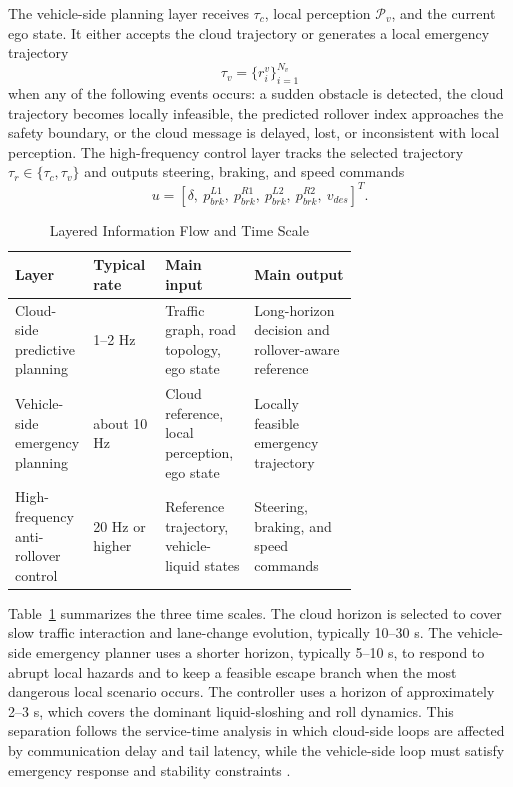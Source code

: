 The vehicle-side planning layer receives $\tau_c$, local perception $\mathcal{P}_v$, and the current ego state. It either accepts the cloud trajectory or generates a local emergency trajectory
\begin{equation}
  \tau_v=\{r_i^v\}_{i=1}^{N_v}
\end{equation}
when any of the following events occurs: a sudden obstacle is detected, the cloud trajectory becomes locally infeasible, the predicted rollover index approaches the safety boundary, or the cloud message is delayed, lost, or inconsistent with local perception. The high-frequency control layer tracks the selected trajectory $\tau_r\in\{\tau_c,\tau_v\}$ and outputs steering, braking, and speed commands
\begin{equation}
  u=[\delta,\ p_{brk}^{L1},\ p_{brk}^{R1},\ p_{brk}^{L2},\ p_{brk}^{R2},\ v_{des}]^T.
\end{equation}

\begin{table}[t]
  \centering
  \caption{Layered Information Flow and Time Scale}
  \label{tab:workflow_timescale}
  \begin{tabularx}{\linewidth}{p{0.21\linewidth}p{0.21\linewidth}p{0.26\linewidth}X}
    \toprule
    Layer & Typical rate & Main input & Main output \\
    \midrule
    Cloud-side predictive planning & 1--2 Hz & Traffic graph, road topology, ego state & Long-horizon decision and rollover-aware reference \\
    Vehicle-side emergency planning & about 10 Hz & Cloud reference, local perception, ego state & Locally feasible emergency trajectory \\
    High-frequency anti-rollover control & 20 Hz or higher & Reference trajectory, vehicle-liquid states & Steering, braking, and speed commands \\
    \bottomrule
  \end{tabularx}
\end{table}

Table~\ref{tab:workflow_timescale} summarizes the three time scales. The cloud horizon is selected to cover slow traffic interaction and lane-change evolution, typically 10--30 s. The vehicle-side emergency planner uses a shorter horizon, typically 5--10 s, to respond to abrupt local hazards and to keep a feasible escape branch when the most dangerous local scenario occurs. The controller uses a horizon of approximately 2--3 s, which covers the dominant liquid-sloshing and roll dynamics. This separation follows the service-time analysis in which cloud-side loops are affected by communication delay and tail latency, while the vehicle-side loop must satisfy emergency response and stability constraints \cite{xionglu2024_CVIS_survay,xuqing2021unreliable,wang2021platoonmpc}.

